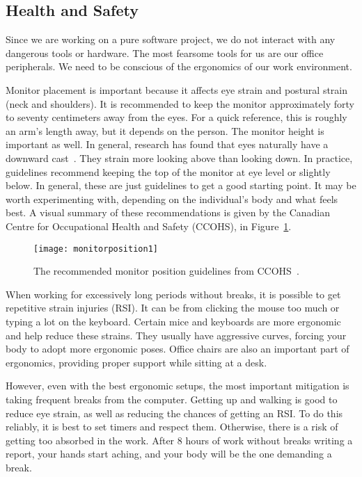 \subsection{Health and Safety}\label{subsec:healthnsafety}

Since we are working on a pure software project,
we do not interact with any dangerous tools or hardware.
The most fearsome tools for us are our office peripherals.
We need to be conscious of the ergonomics of our work environment.


Monitor placement is important because it affects eye strain and postural strain (neck and shoulders).
It is recommended to keep the monitor approximately forty to seventy centimeters away from the eyes.
For a quick reference, this is roughly an arm's length away, but it depends on the person.
The monitor height is important as well.
In general, research has found that eyes naturally have a downward cast~\cite{health_and_safety}.
They strain more looking above than looking down.
In practice, guidelines recommend keeping the top of the monitor at eye level or slightly below.
In general, these are just guidelines to get a good starting point.
It may be worth experimenting with, depending on the individual's body and what feels best.
A visual summary of these recommendations is given by the Canadian Centre for Occupational Health and Safety (CCOHS), in Figure~\ref{fig:monitor-pos}.
\begin{figure}[h]
    \centering
    \texttt{[image: monitorposition1]}
    \caption{The recommended monitor position guidelines from CCOHS~\cite{health_and_safety}.}
    \label{fig:monitor-pos}
\end{figure}

When working for excessively long periods without breaks,
it is possible to get repetitive strain injuries (RSI).
It can be from clicking the mouse too much or typing a lot on the keyboard.
Certain mice and keyboards are more ergonomic and help reduce these strains.
They usually have aggressive curves, forcing your body to adopt more ergonomic poses.
Office chairs are also an important part of ergonomics, providing proper support while sitting at a desk.

However, even with the best ergonomic setups, the most important mitigation is taking frequent breaks from the computer.
Getting up and walking is good to reduce eye strain, as well as reducing the chances of getting an RSI.
To do this reliably, it is best to set timers and respect them.
Otherwise, there is a risk of getting too absorbed in the work.
After 8 hours of work without breaks writing a report, your hands start aching, and your body will be the one demanding a break.

